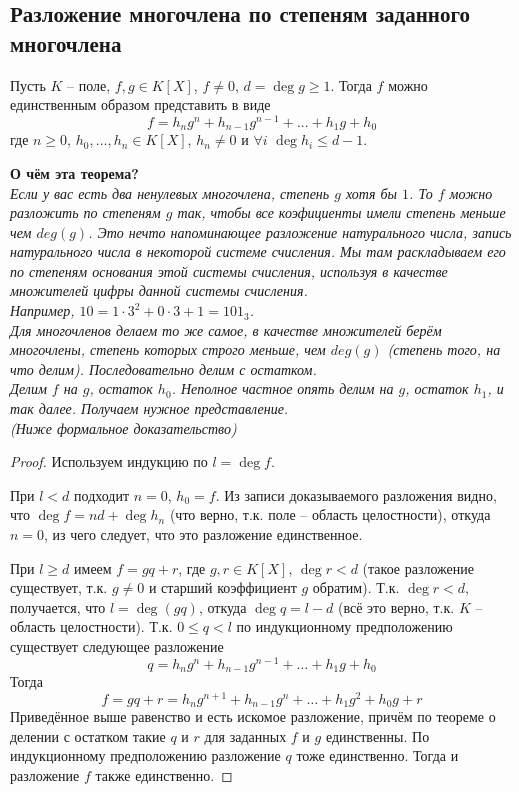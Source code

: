 
\begin{normalsize}
\section{Разложение многочлена по степеням заданного многочлена}

\begin{theorem-non}
    Пусть $K$ -- поле, $f, g \in K[X]$, $f \neq 0$,
    $d = \deg g \geqslant 1$. Тогда $f$ можно единственным
    образом представить в виде
    \[f = h_n g^n + h_{n-1}g^{n-1} + ... + h_1 g + h_0\]
    где $n \geqslant 0$, $h_0, \dots, h_n \in K[X]$,
    $h_n \neq 0$ и $\forall i \,\, \deg h_i \leqslant 
    d - 1$.
\end{theorem-non}

\textbf{О чём эта теорема?} \\
    \emph{Если у вас есть два ненулевых многочлена, степень $g$ хотя бы $1$. То $f$ можно разложить по степеням $g$ так,
    чтобы все коэфициенты имели степень меньше чем $deg(g)$.
    Это нечто напоминающее разложение натурального числа, запись натурального числа в некоторой системе счисления. Мы там раскладываем
    его по степеням основания этой системы счисления, используя в качестве множителей цифры данной системы счисления.} \\
    \emph{Например, $10 = 1 \cdot 3^2 + 0 \cdot 3 + 1 = 101_3$.} \\
    \emph{ Для многочленов делаем то же самое, в качестве множителей берём многочлены,
    степень которых строго меньше, чем $deg(g)$ (степень того, на что делим).
    Последовательно делим с остатком. \\
    Делим  $f$ на $g$, остаток $h_0$.
    Неполное частное опять делим на $g$, остаток $h_1$, и так далее.
    Получаем нужное представление. \\
    (Ниже формальное доказательство)
    }

\begin{proof}
    Используем индукцию по $l = \deg f$.

    При $l < d$ подходит $n = 0$, $h_0 = f$. Из записи доказываемого
    разложения видно, что $\deg f = nd + \deg h_n$ (что верно, т.к.
    поле -- область целостности), откуда $n = 0$, из чего следует, что
    это разложение единственное.

    При $l \geqslant d$ имеем $f = gq + r$, где $g, r \in K[X]$,
    $\deg r < d$ (такое разложение существует, т.к. $g \neq 0$ и
    старший коэффициент $g$ обратим). Т.к. $\deg r < d$, получается,
    что $l = \deg(gq)$, откуда $\deg q = l - d$ (всё это верно, т.к.
    $K$ -- область целостности). Т.к. $0 \leqslant q < l$ по 
    индукционному предположению существует следующее разложение
    \[q = h_n g^n + h_{n-1} g^{n-1} + \dots + h_1 g + h_0\]
    Тогда
    \[f = gq + r = h_n g^{n+1} + h_{n-1} g^n + \dots + h_1 g^2 + 
    h_0 g + r\]
    Приведённое выше равенство и есть искомое разложение, причём
    по теореме о делении с остатком такие $q$ и $r$ для заданных
    $f$ и $g$ единственны. По индукционному предположению разложение
    $q$ тоже единственно. Тогда и разложение $f$ также единственно.


\end{proof}
\end{normalsize}
